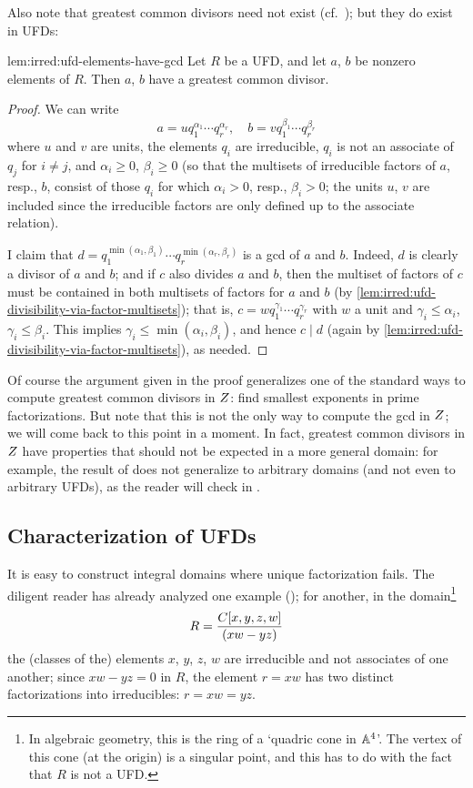 Also note that greatest common divisors need not exist (cf.\
); but they do exist
in UFDs:
\begin{lem}{}{lem:irred:ufd-elements-have-gcd}
  Let $R$ be a UFD, and let $a$, $b$ be nonzero elements of $R$. Then
  $a$, $b$ have a greatest common divisor.
\end{lem}

\begin{proof}
  We can write
  \[a = u q_1^{\alpha_1} \cdots q_r^{\alpha_r}, \quad b = v
    q_1^{\beta_1} \cdots q_r^{\beta_r}\] where $u$ and $v$ are units,
  the elements $q_i$ are irreducible, $q_i$ is not an associate of
  $q_j$ for $i \neq j$, and $\alpha_i \geq 0$, $\beta_i \geq 0$ (so
  that the multisets of irreducible factors of $a$, resp., $b$,
  consist of those $q_i$ for which $\alpha_i > 0$, resp.,
  $\beta_i > 0$; the units $u$, $v$ are included since the irreducible
  factors are only defined up to the associate relation).

  I claim that
  $d = q_1^{\min(\alpha_1,\beta_1)} \cdots
  q_r^{\min(\alpha_r,\beta_r)}$ is a gcd of $a$ and $b$. Indeed, $d$
  is clearly a divisor of $a$ and $b$; and if $c$ also divides $a$ and
  $b$, then the multiset of factors of $c$ must be contained in both
  multisets of factors for $a$ and $b$ (by \cref{lem:irred:ufd-divisibility-via-factor-multisets}); that
  is, $c = w q_1^{\gamma_1} \cdots q_r^{\gamma_r}$ with $w$ a unit and
  $\gamma_i \leq \alpha_i$, $\gamma_i \leq \beta_i$. This implies
  $\gamma_i \leq \min(\alpha_i, \beta_i)$, and hence $c \mid d$ (again
  by \cref{lem:irred:ufd-divisibility-via-factor-multisets}), as needed.
\end{proof}
Of course the argument given in the proof generalizes one of the
standard ways to compute greatest common divisors in $Z$: find
smallest exponents in prime factorizations. But note that this is not
the only way to compute the gcd in $Z$; we will come back to this
point in a moment. In fact, greatest common divisors in $Z$ have
properties that should not be expected in a more general domain: for
example, the result of \Cref{exer:groups:bezout} does not generalize
to arbitrary domains (and not even to arbitrary UFDs), as the reader
will check in \Cref{exer:irred:gcd-not-lin-comb-in-zxy}.

\subsection{Characterization of UFDs}
\label{subsec:irred:characterization-of-ufds}
It is easy to construct integral domains where unique factorization
fails.  The diligent reader has already analyzed one example
(); for another, in the
domain\footnote{In algebraic geometry, this is the ring of a `quadric
  cone in $\mathbb{A}^4$'. The vertex of this cone (at the origin) is a
  singular point, and this has to do with the fact that $R$ is not a
  UFD.}
\[R = \frac{C[x,y,z,w]}{(xw - yz)}\] the (classes of the) elements
$x$, $y$, $z$, $w$ are irreducible and not associates of one another;
since $xw - yz = 0$ in $R$, the element $r = xw$ has two distinct
factorizations into irreducibles: $r = xw = yz$.

